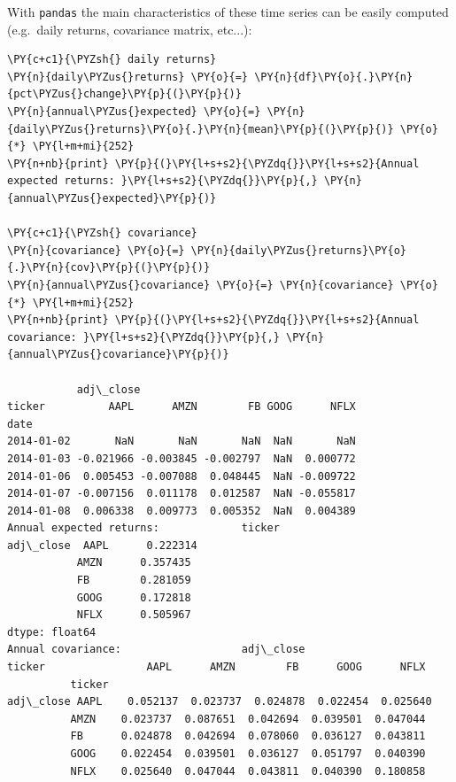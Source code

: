     With \texttt{pandas} the main characteristics of these time series can
be easily computed (e.g.~daily returns, covariance matrix, etc...):

    \begin{tcolorbox}[breakable, size=fbox, boxrule=1pt, pad at break*=1mm,colback=cellbackground, colframe=cellborder]
\begin{Verbatim}[commandchars=\\\{\}]
\PY{c+c1}{\PYZsh{} daily returns}
\PY{n}{daily\PYZus{}returns} \PY{o}{=} \PY{n}{df}\PY{o}{.}\PY{n}{pct\PYZus{}change}\PY{p}{(}\PY{p}{)}
\PY{n}{annual\PYZus{}expected} \PY{o}{=} \PY{n}{daily\PYZus{}returns}\PY{o}{.}\PY{n}{mean}\PY{p}{(}\PY{p}{)} \PY{o}{*} \PY{l+m+mi}{252}
\PY{n+nb}{print} \PY{p}{(}\PY{l+s+s2}{\PYZdq{}}\PY{l+s+s2}{Annual expected returns: }\PY{l+s+s2}{\PYZdq{}}\PY{p}{,} \PY{n}{annual\PYZus{}expected}\PY{p}{)}

\PY{c+c1}{\PYZsh{} covariance}
\PY{n}{covariance} \PY{o}{=} \PY{n}{daily\PYZus{}returns}\PY{o}{.}\PY{n}{cov}\PY{p}{(}\PY{p}{)}
\PY{n}{annual\PYZus{}covariance} \PY{o}{=} \PY{n}{covariance} \PY{o}{*} \PY{l+m+mi}{252}
\PY{n+nb}{print} \PY{p}{(}\PY{l+s+s2}{\PYZdq{}}\PY{l+s+s2}{Annual covariance: }\PY{l+s+s2}{\PYZdq{}}\PY{p}{,} \PY{n}{annual\PYZus{}covariance}\PY{p}{)}

           adj\_close
ticker          AAPL      AMZN        FB GOOG      NFLX
date
2014-01-02       NaN       NaN       NaN  NaN       NaN
2014-01-03 -0.021966 -0.003845 -0.002797  NaN  0.000772
2014-01-06  0.005453 -0.007088  0.048445  NaN -0.009722
2014-01-07 -0.007156  0.011178  0.012587  NaN -0.055817
2014-01-08  0.006338  0.009773  0.005352  NaN  0.004389
Annual expected returns:             ticker
adj\_close  AAPL      0.222314
           AMZN      0.357435
           FB        0.281059
           GOOG      0.172818
           NFLX      0.505967
dtype: float64
Annual covariance:                   adj\_close
ticker                AAPL      AMZN        FB      GOOG      NFLX
          ticker
adj\_close AAPL    0.052137  0.023737  0.024878  0.022454  0.025640
          AMZN    0.023737  0.087651  0.042694  0.039501  0.047044
          FB      0.024878  0.042694  0.078060  0.036127  0.043811
          GOOG    0.022454  0.039501  0.036127  0.051797  0.040390
          NFLX    0.025640  0.047044  0.043811  0.040390  0.180858
    \end{Verbatim}
\end{tcolorbox}

